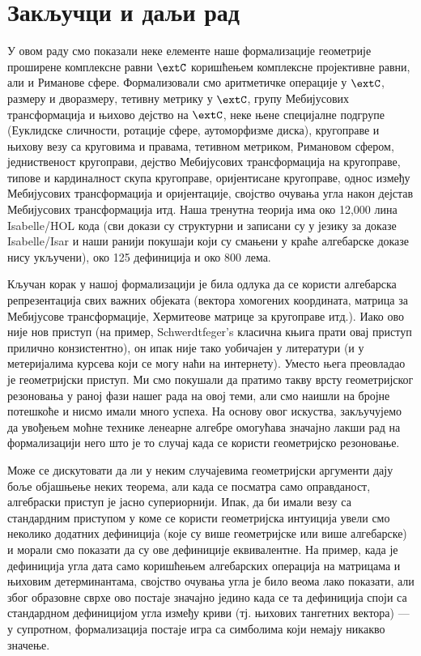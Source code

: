 \section{Закључци и даљи рад}
\label{sec:concl}
У овом раду смо показали неке елементе наше формализације геометрије
проширене комплексне равни $\extC$ коришћењем комплексне пројективне
равни, али и Риманове сфере. Формализовали смо аритметичке операције у
$\extC$, размеру и дворазмеру, тетивну метрику у $\extC$, групу
Мебијусових трансформација и њихово дејство на $\extC$, неке њене
специјалне подгрупе (Еуклидске сличности, ротације сфере, аутоморфизме
диска), кругоправе и њихову везу са круговима и правама, тетивном
метриком, Римановом сфером, једниственост кругоправи, дејство
Мебијусових трансформација на кругоправе, типове и кардиналност скупа
кругоправе, оријентисане кругоправе, однос између Мебијусових
трансформација и оријентације, својство очувања угла након дејстав
Мебијусових трансформација итд. Наша тренутна теорија има око 12,000
лина Isabelle/HOL кода (сви докази су структурни и записани су у
језику за доказе Isabelle/Isar и наши ранији покушаји који су смањени
у краће алгебарске доказе нису укључени), око 125 дефиниција и око 800
лема.

Кључан корак у нашој формализацији је била одлука да се користи
алгебарска репрезентација свих важних објеката (вектора хомогених
координата, матрица за Мебијусове трансформације, Хермитеове матрице
за кругоправе итд.). Иако ово није нов приступ (на пример,
Schwerdtfeger's класична књига \cite{schwerdtfeger} прати овај приступ
прилично конзистентно), он ипак није тако уобичајен у литератури (и у
метеријалима курсева који се могу наћи на интернету). Уместо њега
преовладао је геометријски приступ.  Ми смо покушали да пратимо такву
врсту геометријског резоновања у раној фази нашег рада на овој теми,
али смо наишли на бројне потешкоће и нисмо имали много успеха. На
основу овог искуства, закључујемо да увођењем моћне технике ленеарне
алгебре омогућава значајно лакши рад на формализацији него што је то
случај када се користи геометријско резоновање.

Може се дискутовати да ли у неким случајевима геометријски аргументи
дају боље објашњење неких теорема, али када се посматра само
оправданост, алгебраски приступ је јасно супериорнији. Ипак, да би
имали везу са стандардним приступом у коме се користи геометријска
интуиција увели смо неколико додатних дефиниција (које су више
геометријске или више алгебарске) и морали смо показати да су ове
дефиниције еквивалентне. На пример, када је дефиниција угла дата само
коришћењем алгебарских операција на матрицама и њиховим
детерминантама, својство очувања угла је било веома лако показати, али
због образовне сврхе ово постаје значајно једино када се та дефиниција
споји са стандардном дефиницијом угла између криви (тј. њихових
тангетних вектора) --- у супротном, формализација постаје игра са
симболима који немају никакво значење.

